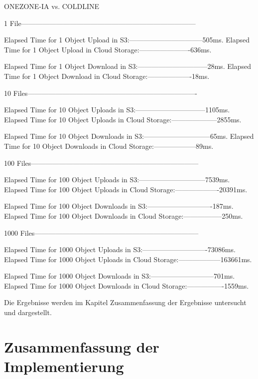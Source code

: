\begin{code}
ONEZONE-IA vs. COLDLINE

1 File---------------------------------------------------------------------------

Elapsed Time for 1  Object Upload in S3:--------------------------------505ms.
Elapsed Time for 1 Object Upload in Cloud Storage:----------------------636ms.

Elapsed Time for 1 Object Download in S3:------------------------------28ms.
Elapsed Time for 1 Object Download in Cloud Storage:-------------------18ms.

10 Files-------------------------------------------------------------------------

Elapsed Time for 10  Object Uploads in S3:------------------------------1105ms.
Elapsed Time for 10 Object Uploads in Cloud Storage:--------------------2855ms.

Elapsed Time for 10 Object Downloads in S3:-----------------------------65ms.
Elapsed Time for 10 Object Downloads in Cloud Storage:------------------89ms.

100 Files------------------------------------------------------------------------

Elapsed Time for 100  Object Uploads in S3:-----------------------------7539ms.
Elapsed Time for 100 Object Uploads in Cloud Storage:-------------------20391ms.

Elapsed Time for 100 Object Downloads in S3:----------------------------187ms.
Elapsed Time for 100 Object Downloads in Cloud Storage:-----------------250ms.

1000 Files-----------------------------------------------------------------------

Elapsed Time for 1000  Object Uploads in S3:----------------------------73086ms.
Elapsed Time for 1000 Object Uploads in Cloud Storage:------------------163661ms.

Elapsed Time for 1000 Object Downloads in S3:---------------------------701ms.
Elapsed Time for 1000 Object Downloads in Cloud Storage:----------------1559ms.
\end{code}

Die Ergebnisse werden im Kapitel Zusammenfassung der Ergebnisse untersucht und dargestellt.

\newpage

\section{Zusammenfassung der Implementierung}

